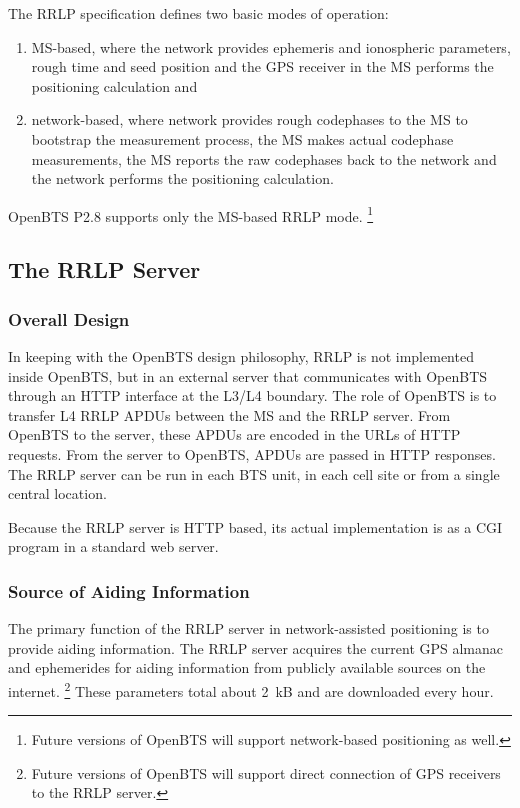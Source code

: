 \documentclass[11pt,openany]{book}
\begin{document}
The RRLP specification defines two basic modes of operation:
\begin{enumerate}
	\item MS-based, where the network provides ephemeris and ionospheric parameters, rough time and seed position and the GPS receiver in the MS performs the positioning calculation and
	\item network-based, where network provides rough codephases to the MS to bootstrap the measurement process, the MS makes actual codephase measurements, the MS reports the raw codephases back to the network and the network performs the positioning calculation.
\end{enumerate}
OpenBTS P2.8 supports only the MS-based RRLP mode.%
\footnote{Future versions of OpenBTS will support network-based positioning as well.}

\subsection{The RRLP Server}
\subsubsection{Overall Design}
In keeping with the OpenBTS design philosophy, RRLP is not implemented inside OpenBTS, but in an external server that communicates with OpenBTS through an HTTP interface at the L3/L4 boundary.
The role of OpenBTS is to transfer L4 RRLP APDUs between the MS and the RRLP server.
From OpenBTS to the server, these APDUs are encoded in the URLs of HTTP requests.
From the server to OpenBTS, APDUs are passed in HTTP responses.
The RRLP server can be run in each BTS unit, in each cell site or from a single central location.

Because the RRLP server is HTTP based, its actual implementation is as a CGI program in a standard web server.

\subsubsection{Source of Aiding Information}
The primary function of the RRLP server in network-assisted positioning is to provide aiding information.
The RRLP server acquires the current GPS almanac and ephemerides for aiding information from publicly available sources on the internet.%
\footnote{Future versions of OpenBTS will support direct connection of GPS receivers to the RRLP server.}
These parameters total about 2~kB and are downloaded every hour.
\end{document}
